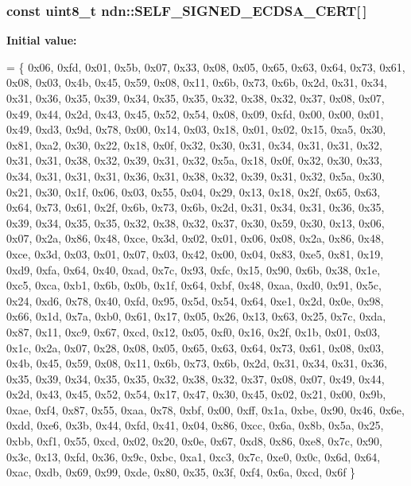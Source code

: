 \begin{DoxyVerb}
\subsubsection[{\texorpdfstring{S\+E\+L\+F\+\_\+\+S\+I\+G\+N\+E\+D\+\_\+\+E\+C\+D\+S\+A\+\_\+\+C\+E\+RT}{SELF\_SIGNED\_ECDSA\_CERT}}]{\setlength{\rightskip}{0pt plus 5cm}const uint8\+\_\+t ndn\+::\+S\+E\+L\+F\+\_\+\+S\+I\+G\+N\+E\+D\+\_\+\+E\+C\+D\+S\+A\+\_\+\+C\+E\+RT\mbox{[}$\,$\mbox{]}}\hypertarget{namespacendn_abbb1925ba4e5b700f2e489329eb25714}{}\label{namespacendn_abbb1925ba4e5b700f2e489329eb25714}
{\bfseries Initial value\+:}
\begin{DoxyCode}
= \{
0x06, 0xfd, 0x01, 0x5b, 0x07, 0x33, 0x08, 0x05, 0x65, 0x63, 0x64, 0x73, 0x61, 0x08, 0x03,
0x4b, 0x45, 0x59, 0x08, 0x11, 0x6b, 0x73, 0x6b, 0x2d, 0x31, 0x34, 0x31, 0x36, 0x35, 0x39,
0x34, 0x35, 0x35, 0x32, 0x38, 0x32, 0x37, 0x08, 0x07, 0x49, 0x44, 0x2d, 0x43, 0x45, 0x52,
0x54, 0x08, 0x09, 0xfd, 0x00, 0x00, 0x01, 0x49, 0xd3, 0x9d, 0x78, 0x00, 0x14, 0x03, 0x18,
0x01, 0x02, 0x15, 0xa5, 0x30, 0x81, 0xa2, 0x30, 0x22, 0x18, 0x0f, 0x32, 0x30, 0x31, 0x34,
0x31, 0x31, 0x32, 0x31, 0x31, 0x38, 0x32, 0x39, 0x31, 0x32, 0x5a, 0x18, 0x0f, 0x32, 0x30,
0x33, 0x34, 0x31, 0x31, 0x31, 0x36, 0x31, 0x38, 0x32, 0x39, 0x31, 0x32, 0x5a, 0x30, 0x21,
0x30, 0x1f, 0x06, 0x03, 0x55, 0x04, 0x29, 0x13, 0x18, 0x2f, 0x65, 0x63, 0x64, 0x73, 0x61,
0x2f, 0x6b, 0x73, 0x6b, 0x2d, 0x31, 0x34, 0x31, 0x36, 0x35, 0x39, 0x34, 0x35, 0x35, 0x32,
0x38, 0x32, 0x37, 0x30, 0x59, 0x30, 0x13, 0x06, 0x07, 0x2a, 0x86, 0x48, 0xce, 0x3d, 0x02,
0x01, 0x06, 0x08, 0x2a, 0x86, 0x48, 0xce, 0x3d, 0x03, 0x01, 0x07, 0x03, 0x42, 0x00, 0x04,
0x83, 0xe5, 0x81, 0x19, 0xd9, 0xfa, 0x64, 0x40, 0xad, 0x7c, 0x93, 0xfc, 0x15, 0x90, 0x6b,
0x38, 0x1e, 0xc5, 0xca, 0xb1, 0x6b, 0x0b, 0x1f, 0x64, 0xbf, 0x48, 0xaa, 0xd0, 0x91, 0x5c,
0x24, 0xd6, 0x78, 0x40, 0xfd, 0x95, 0x5d, 0x54, 0x64, 0xe1, 0x2d, 0x0e, 0x98, 0x66, 0x1d,
0x7a, 0xb0, 0x61, 0x17, 0x05, 0x26, 0x13, 0x63, 0x25, 0x7c, 0xda, 0x87, 0x11, 0xc9, 0x67,
0xcd, 0x12, 0x05, 0xf0, 0x16, 0x2f, 0x1b, 0x01, 0x03, 0x1c, 0x2a, 0x07, 0x28, 0x08, 0x05,
0x65, 0x63, 0x64, 0x73, 0x61, 0x08, 0x03, 0x4b, 0x45, 0x59, 0x08, 0x11, 0x6b, 0x73, 0x6b,
0x2d, 0x31, 0x34, 0x31, 0x36, 0x35, 0x39, 0x34, 0x35, 0x35, 0x32, 0x38, 0x32, 0x37, 0x08,
0x07, 0x49, 0x44, 0x2d, 0x43, 0x45, 0x52, 0x54, 0x17, 0x47, 0x30, 0x45, 0x02, 0x21, 0x00,
0x9b, 0xae, 0xf4, 0x87, 0x55, 0xaa, 0x78, 0xbf, 0x00, 0xff, 0x1a, 0xbe, 0x90, 0x46, 0x6e,
0xdd, 0xe6, 0x3b, 0x44, 0xfd, 0x41, 0x04, 0x86, 0xcc, 0x6a, 0x8b, 0x5a, 0x25, 0xbb, 0xf1,
0x55, 0xcd, 0x02, 0x20, 0x0e, 0x67, 0xd8, 0x86, 0xe8, 0x7c, 0x90, 0x3c, 0x13, 0xfd, 0x36,
0x9c, 0xbc, 0xa1, 0xc3, 0x7c, 0xe0, 0x0c, 0x6d, 0x64, 0xac, 0xdb, 0x69, 0x99, 0xde, 0x80,
0x35, 0x3f, 0xf4, 0x6a, 0xcd, 0x6f
\}
\end{DoxyCode}



\end{DoxyVerb}
